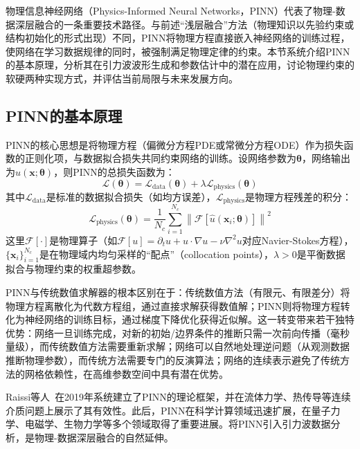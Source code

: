 物理信息神经网络（Physics-Informed Neural Networks，PINN）代表了物理-数据深层融合的一条重要技术路径。与前述“浅层融合”方法（物理知识以先验约束或结构初始化的形式出现）不同，PINN将物理方程直接嵌入神经网络的训练过程，使网络在学习数据规律的同时，被强制满足物理定律的约束。本节系统介绍PINN的基本原理，分析其在引力波波形生成和参数估计中的潜在应用，讨论物理约束的软硬两种实现方式，并评估当前局限与未来发展方向。

\subsection*{PINN的基本原理}

PINN的核心思想是将物理方程（偏微分方程PDE或常微分方程ODE）作为损失函数的正则化项，与数据拟合损失共同约束网络的训练。设网络参数为$\boldsymbol{\theta}$，网络输出为$\hat{u}(\mathbf{x}; \boldsymbol{\theta})$，则PINN的总损失函数为：
\begin{equation}
\mathcal{L}(\boldsymbol{\theta}) = \mathcal{L}_{\text{data}}(\boldsymbol{\theta}) + \lambda \mathcal{L}_{\text{physics}}(\boldsymbol{\theta})
\end{equation}
其中$\mathcal{L}_{\text{data}}$是标准的数据拟合损失（如均方误差），$\mathcal{L}_{\text{physics}}$是物理方程残差的积分：
\begin{equation}
\mathcal{L}_{\text{physics}}(\boldsymbol{\theta}) = \frac{1}{N_c} \sum_{i=1}^{N_c} \left\| \mathcal{F}\left[\hat{u}(\mathbf{x}_i; \boldsymbol{\theta})\right] \right\|^2
\end{equation}
这里$\mathcal{F}[\cdot]$是物理算子（如$\mathcal{F}[u] = \partial_t u + u \cdot \nabla u - \nu \nabla^2 u$对应Navier-Stokes方程），$\{\mathbf{x}_i\}_{i=1}^{N_c}$是在物理域内均匀采样的“配点”（collocation points），$\lambda > 0$是平衡数据拟合与物理约束的权重超参数。

PINN与传统数值求解器的根本区别在于：传统数值方法（有限元、有限差分）将物理方程离散化为代数方程组，通过直接求解获得数值解；PINN则将物理方程转化为神经网络的训练目标，通过梯度下降优化获得近似解。这一转变带来若干独特优势：网络一旦训练完成，对新的初始/边界条件的推断只需一次前向传播（毫秒量级），而传统数值方法需要重新求解；网络可以自然地处理逆问题（从观测数据推断物理参数），而传统方法需要专门的反演算法；网络的连续表示避免了传统方法的网格依赖性，在高维参数空间中具有潜在优势。

Raissi等人~\cite{raissi2019pinn}在2019年系统建立了PINN的理论框架，并在流体力学、热传导等连续介质问题上展示了其有效性。此后，PINN在科学计算领域迅速扩展，在量子力学、电磁学、生物力学等多个领域取得了重要进展。将PINN引入引力波数据分析，是物理-数据深层融合的自然延伸。

